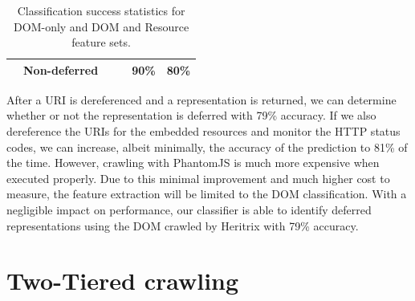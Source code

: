 \documentclass{ipres_proc_article-sp}
\begin{document}
\begin{center}
\begin{table}[ht]
\begin{tabular}{l|l|r|r|r|r}
                                                                                        & Non-deferred   &                                                                                       &  & 90\%                                                                                   & 80\% \\               
\hline                                                               
\end{tabular}

 \caption{Classification success statistics for DOM-only and DOM and Resource feature sets.}
  \label{classStats}
\end{table}
\end{center}

After a URI is dereferenced and a representation is returned, we can determine whether or not the representation is deferred with 79\% accuracy. If we also dereference the URIs for the embedded resources and monitor the HTTP status codes, we can increase, albeit minimally, the accuracy of the prediction to 81\% of the time. However, crawling with PhantomJS is much more expensive when executed properly. Due to this minimal improvement and much higher cost to measure, the feature extraction will be limited to the DOM classification. With a negligible impact on performance, our classifier is able to identify deferred representations using the DOM crawled by Heritrix with 79\% accuracy.


\section{Two-Tiered crawling}
\label{frame}
\end{document}
